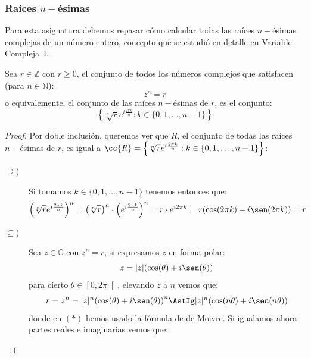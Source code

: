 \subsubsection{Raíces $n-$ésimas}
\noindent
Para esta asignatura debemos repasar cómo calcular todas las raíces $n-$ésimas complejas de un número entero, concepto que se estudió en detalle en Variable Compleja~I.
\begin{prop}
    Sea $r\in \mathbb{Z}$ con $r\geq 0$, el conjunto de todos los números complejos que satisfacen (para $n\in \mathbb{N}$):
    \begin{equation*}
        z^n = r
    \end{equation*}
    o equivalemente, el conjunto de las raíces $n-$ésimas de $r$, es el conjunto:
    \begin{equation*}
        \left\{\sqrt[n]{r} e^{i \frac{2\pi k}{n}} : k \in \{0,1,\ldots,n-1\}\right\}
    \end{equation*}
    \begin{proof}
        Por doble inclusión, queremos ver que $R$, el conjunto de todas las raíces $n-$ésimas de $r$, es igual a $\cc{R} = \left\{\sqrt[n]{r} e^{i \frac{2\pi k}{n}} : k \in \{0,1,\ldots,n-1\}\right\}$:
        \begin{description}
            \item [$\supseteq$)] Si tomamos $k \in \{0,1,\ldots,n-1\}$ tenemos entonces que:
                \begin{equation*}
                    {\left(\sqrt[n]{r}e^{i\frac{2\pi k}{n}}\right)}^{n} = {\left(\sqrt[n]{r}\right)}^{n} \cdot {\left(e^{i\frac{2\pi k}{n}}\right)}^{n} = r\cdot e^{i 2\pi k} = r(\cos(2\pi k) + i\sen(2\pi k)) = r
                \end{equation*}
            \item [$\subseteq$)] Sea $z\in \mathbb{C}$ con $z^n = r$, si expresamos $z$ en forma polar:
                \begin{equation*}
                    z = |z|(\cos(\theta) + i\sen(\theta))
                \end{equation*}
                para cierto $\theta\in \left[0,2\pi\right[$, elevando $z$ a $n$ vemos que:
                \begin{equation*}
                    r = z^n = |z|^n {(\cos(\theta) + i\sen(\theta))}^{n} \AstIg |z|^n (\cos(n\theta) + i\sen(n\theta))
                \end{equation*}
                donde en $(\ast)$ hemos usado la fórmula de de Moivre. Si igualamos ahora partes reales e imaginarias vemos que:

\end{description}
\end{proof}
\end{prop}
